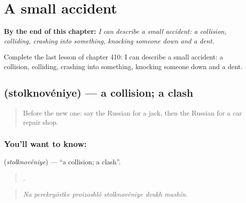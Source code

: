 
\chapter{A small accident}
\label{ch:ru-a-small-accident}

\begin{chapteropening}
\textbf{By the end of this chapter:} \emph{I can describe a small accident: a collision, colliding, crashing into something, knocking someone down and a dent.}

Complete the last lesson of chapter 410: I can describe a small accident: a collision, colliding, crashing into something, knocking someone down and a dent.
\end{chapteropening}

\section[\texorpdfstring{\ru{столкновение} (stolknovéniye)}{столкновение (stolknovéniye)}]{ (stolknovéniye) — a collision; a clash}

\label{lesson:RU-C410-stolknoveniye}



\begin{quote}
Before the new one: say the Russian for a jack, then the Russian for a car repair shop.
\end{quote}

\subsection*{You'll want to know: }
\textbf{} (\emph{stolknovéniye}) — \textquotedblleft{}a collision; a clash\textquotedblright{}.

\begin{quote}
     .
\end{quote}

\begin{quote}
\emph{Na perekryóstke proizoshló stolknovéniye dvukh mashín.}
\end{quote}

